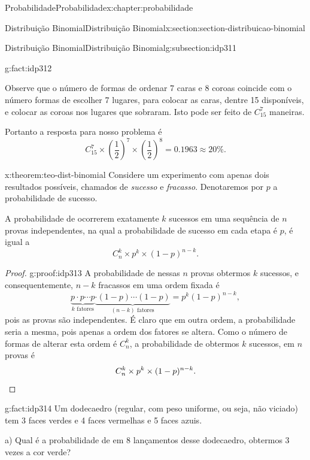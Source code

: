 \documentclass[oneside,10pt,]{book}
\newcommand{\qedhere}{\relax}
\numberwithin{equation}{section}
\begin{document}
\begin{chapterptx}{Probabilidade}{}{Probabilidade}{}{}{x:chapter:probabilidade}
\begin{sectionptx}{Distribuição Binomial}{}{Distribuição Binomial}{}{}{x:section:section-distribuicao-binomial}
\begin{subsectionptx}{Distribuição Binomial}{}{Distribuição Binomial}{}{}{g:subsection:idp311}
\begin{fact}{}{}{g:fact:idp312}
\par
Observe que o número de formas de ordenar 7 caras e 8 coroas coincide com o número formas de escolher 7 lugares, para colocar as caras, dentre 15 disponíveis, e colocar as coroas nos lugares que sobraram. Isto pode ser feito de \(C_{15}^{7}\) maneiras.%
\par
Portanto a resposta para nosso problema é%
\begin{equation*}
C_{15}^{7}\times \left(\frac{1}{2}\right)^7 \times \left(\frac{1}{2}\right)^{8}=0.1963 \approx 20\%. 
\end{equation*}
%
\end{fact}
\begin{theorem}{}{}{x:theorem:teo-dist-binomial}%
Considere um experimento com apenas dois resultados possíveis, chamados de \emph{sucesso} e \emph{fracasso}. Denotaremos por \(p\) a probabilidade de sucesso.%
\par
A probabilidade de ocorrerem exatamente \(k\) sucessos em uma sequência de \(n\) provas independentes, na qual a probabilidade de sucesso em cada etapa é \(p\), é igual a%
\begin{equation*}
C_n^k\times p^k\times (1-p)^{n-k}. 
\end{equation*}
%
\end{theorem}
\begin{proof}{}{g:proof:idp313}
A probabilidade de nessas \(n\) provas obtermos \(k\) sucessos, e consequentemente, \(n-k\) fracassos em uma ordem fixada é%
\begin{equation*}
\underbrace{p\cdot p \cdots p}_{k\text{ fatores}}\underbrace{\cdot (1-p)\cdots(1-p)}_{(n-k)\text{ fatores}} = p^k(1-p)^{n-k}, 
\end{equation*}
pois as provas são independentes. É claro que em outra ordem, a probabilidade seria a mesma, pois apenas a ordem dos fatores se altera. Como o número de formas de alterar esta ordem é \(C_n^k\), a probabilidade de obtermos \(k\) sucessos, em \(n\) provas é%
\begin{equation*}
C_n^k \times p^k\times(1-p)^{n-k}. \qedhere
\end{equation*}
%
\end{proof}
\begin{fact}{}{}{g:fact:idp314}%
Um dodecaedro (regular, com peso uniforme, ou seja, não viciado) tem 3 faces verdes e 4 faces vermelhas e 5 faces azuis.%
\par
a) Qual é a probabilidade de em 8 lançamentos desse dodecaedro, obtermos 3 vezes a cor verde?%
\par

\end{fact}
\end{subsectionptx}
\end{sectionptx}
\end{chapterptx}
\end{document}
